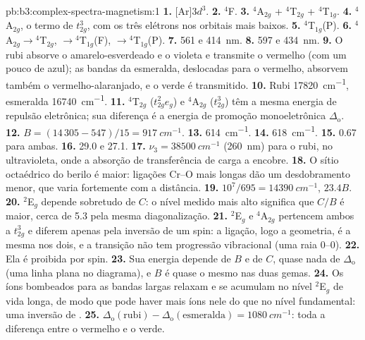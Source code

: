 \begin{solution}{pb:b3:complex-spectra-magnetism:1}
\textbf{1.} [Ar]$3d^3$.
\textbf{2.} $^4$F.
\textbf{3.} $^4$A$_{2g}$ + $^4$T$_{2g}$ + $^4$T$_{1g}$.
\textbf{4.} $^4$A$_{2g}$, o termo de $t_{2g}^3$, com os três elétrons nos orbitais mais baixos.
\textbf{5.} $^4$T$_{1g}$(P).
\textbf{6.} $^4$A$_{2g}\to{}^4$T$_{2g}$, $\to{}^4$T$_{1g}$(F), $\to{}^4$T$_{1g}$(P).
\textbf{7.} 561 e \qty{414}{nm}.
\textbf{8.} 597 e \qty{434}{nm}.
\textbf{9.} O rubi absorve o amarelo-esverdeado e o violeta e transmite o vermelho (com um pouco
de azul); as bandas da esmeralda, deslocadas para o vermelho, absorvem também o vermelho-alaranjado, e o verde
é transmitido.
\textbf{10.} Rubi \qty{17820}{cm^{-1}}, esmeralda \qty{16740}{cm^{-1}}.
\textbf{11.} $^4$T$_{2g}$ ($t_{2g}^2e_g$) e $^4$A$_{2g}$ ($t_{2g}^3$) têm a mesma energia de repulsão eletrônica; sua
diferença é a energia de promoção monoeletrônica $\Delta_{\mathrm o}$.
\textbf{12.} $B = (14\,305 - 547)/15 = \qty{917}{cm^{-1}}$.
\textbf{13.} \qty{614}{cm^{-1}}.
\textbf{14.} \qty{618}{cm^{-1}}.
\textbf{15.} 0.67 para ambas.
\textbf{16.} 29.0 e 27.1.
\textbf{17.} $\nu_3 = \qty{38500}{cm^{-1}}$ (\qty{260}{nm}) para o rubi, no ultravioleta, onde a absorção de
transferência de carga a encobre.
\textbf{18.} O sítio octaédrico do berilo é maior: ligações Cr--O mais longas dão um
desdobramento menor, que varia fortemente com a distância.
\textbf{19.} $10^7/695 = \qty{14390}{cm^{-1}}$, $23.4B$.
\textbf{20.} $^2$E$_g$ depende sobretudo de $C$: o nível medido mais alto significa que $C/B$ é maior,
cerca de 5.3 pela mesma diagonalização.
\textbf{21.} $^2$E$_g$ e $^4$A$_{2g}$ pertencem ambos a $t_{2g}^3$ e diferem apenas pela inversão de um spin: a ligação,
logo a geometria, é a mesma nos dois, e a transição não tem progressão
vibracional (uma raia 0--0).
\textbf{22.} Ela é proibida por spin.
\textbf{23.} Sua energia depende de $B$ e de $C$, quase nada de $\Delta_{\mathrm o}$ (uma linha plana no diagrama),
e $B$ é quase o mesmo nas duas gemas.
\textbf{24.} Os íons bombeados para as bandas largas relaxam e se acumulam no nível
$^2$E$_g$ de vida longa, de modo que pode haver mais íons nele do que no nível fundamental: uma
inversão de .
\textbf{25.} \textbf{$\Delta_{\mathrm o}(\text{rubi}) - \Delta_{\mathrm o}(\text{esmeralda}) = \qty{1080}{cm^{-1}}$}: toda a diferença entre o vermelho e o
verde.
\end{solution}

